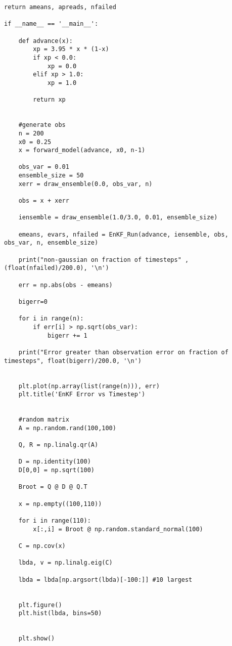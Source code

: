 \documentclass[11pt]{article}
\begin{document}
\begin{Verbatim}[xleftmargin=-2cm]
    return ameans, apreads, nfailed

if __name__ == '__main__':

    def advance(x):
        xp = 3.95 * x * (1-x)
        if xp < 0.0:
            xp = 0.0
        elif xp > 1.0:
            xp = 1.0

        return xp


    #generate obs
    n = 200
    x0 = 0.25
    x = forward_model(advance, x0, n-1)
    
    obs_var = 0.01
    ensemble_size = 50
    xerr = draw_ensemble(0.0, obs_var, n)

    obs = x + xerr
    
    iensemble = draw_ensemble(1.0/3.0, 0.01, ensemble_size)
    
    emeans, evars, nfailed = EnKF_Run(advance, iensemble, obs, obs_var, n, ensemble_size)

    print("non-gaussian on fraction of timesteps" , (float(nfailed)/200.0), '\n')

    err = np.abs(obs - emeans)

    bigerr=0

    for i in range(n):
        if err[i] > np.sqrt(obs_var):
            bigerr += 1

    print("Error greater than observation error on fraction of timesteps", float(bigerr)/200.0, '\n')


    plt.plot(np.array(list(range(n))), err)
    plt.title('EnKF Error vs Timestep')


    #random matrix 
    A = np.random.rand(100,100)

    Q, R = np.linalg.qr(A)

    D = np.identity(100)
    D[0,0] = np.sqrt(100)

    Broot = Q @ D @ Q.T

    x = np.empty((100,110))

    for i in range(110):
        x[:,i] = Broot @ np.random.standard_normal(100)

    C = np.cov(x)

    lbda, v = np.linalg.eig(C)

    lbda = lbda[np.argsort(lbda)[-100:]] #10 largest


    plt.figure()
    plt.hist(lbda, bins=50)

    
    plt.show()
        
\end{Verbatim}        


    
\end{document}
